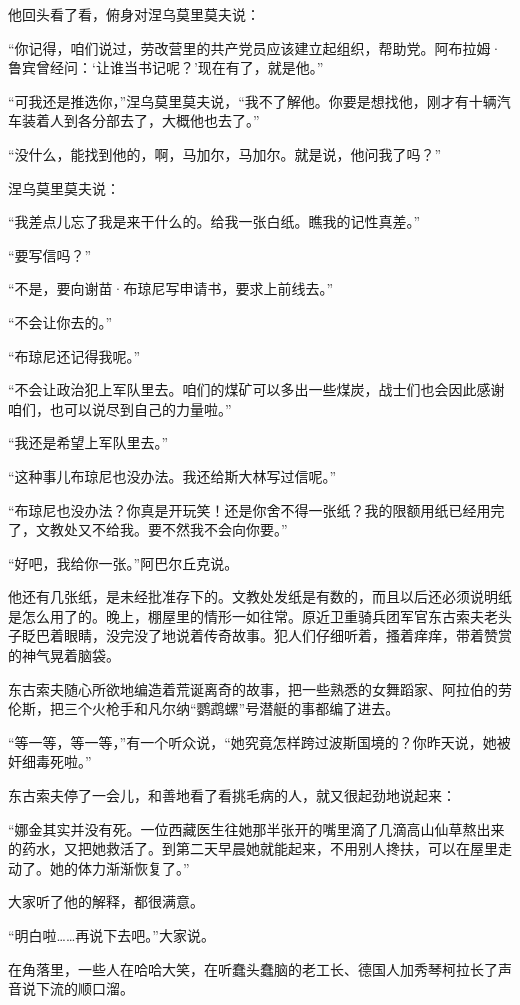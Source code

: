 他回头看了看，俯身对涅乌莫里莫夫说：

“你记得，咱们说过，劳改营里的共产党员应该建立起组织，帮助党。阿布拉姆·鲁宾曾经问：‘让谁当书记呢？’现在有了，就是他。”

“可我还是推选你，”涅乌莫里莫夫说，“我不了解他。你要是想找他，刚才有十辆汽车装着人到各分部去了，大概他也去了。”

“没什么，能找到他的，啊，马加尔，马加尔。就是说，他问我了吗？”

涅乌莫里莫夫说：

“我差点儿忘了我是来干什么的。给我一张白纸。瞧我的记性真差。”

“要写信吗？”

“不是，要向谢苗·布琼尼写申请书，要求上前线去。”

“不会让你去的。”

“布琼尼还记得我呢。”

“不会让政治犯上军队里去。咱们的煤矿可以多出一些煤炭，战士们也会因此感谢咱们，也可以说尽到自己的力量啦。”

“我还是希望上军队里去。”

“这种事儿布琼尼也没办法。我还给斯大林写过信呢。”

“布琼尼也没办法？你真是开玩笑！还是你舍不得一张纸？我的限额用纸已经用完了，文教处又不给我。要不然我不会向你要。”

“好吧，我给你一张。”阿巴尔丘克说。

他还有几张纸，是未经批准存下的。文教处发纸是有数的，而且以后还必须说明纸是怎么用了的。晚上，棚屋里的情形一如往常。原近卫重骑兵团军官东古索夫老头子眨巴着眼睛，没完没了地说着传奇故事。犯人们仔细听着，搔着痒痒，带着赞赏的神气晃着脑袋。

东古索夫随心所欲地编造着荒诞离奇的故事，把一些熟悉的女舞蹈家、阿拉伯的劳伦斯，把三个火枪手和凡尔纳“鹦鹉螺”号潜艇的事都编了进去。

“等一等，等一等，”有一个听众说，“她究竟怎样跨过波斯国境的？你昨天说，她被奸细毒死啦。”

东古索夫停了一会儿，和善地看了看挑毛病的人，就又很起劲地说起来：

“娜金其实并没有死。一位西藏医生往她那半张开的嘴里滴了几滴高山仙草熬出来的药水，又把她救活了。到第二天早晨她就能起来，不用别人搀扶，可以在屋里走动了。她的体力渐渐恢复了。”

大家听了他的解释，都很满意。

“明白啦……再说下去吧。”大家说。

在角落里，一些人在哈哈大笑，在听蠢头蠢脑的老工长、德国人加秀琴柯拉长了声音说下流的顺口溜。


